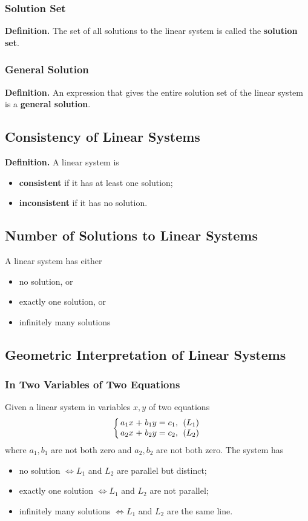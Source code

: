 \documentclass[../ma2001_notes.tex]{subfiles}
\begin{document}
\subsubsection{Solution Set}
\textbf{Definition.} The set of all solutions to the linear system is called the \textbf{solution set}.

\subsubsection{General Solution}
\textbf{Definition.} An expression that gives the entire solution set of the linear system is a \textbf{general solution}.

\subsection{Consistency of Linear Systems}
\textbf{Definition.} A linear system is
\begin{itemize}
	\item \textbf{consistent} if it has at least one solution;
	\item \textbf{inconsistent} if it has no solution.
\end{itemize}

\subsection{Number of Solutions to Linear Systems}
A linear system has either
\begin{itemize}
	\item no solution, or
	\item exactly one solution, or
	\item infinitely many solutions
\end{itemize}

\subsection{Geometric Interpretation of Linear Systems}
\subsubsection{In Two Variables of Two Equations}
Given a linear system in variables \(x, y\) of two equations
\[\left\{
\arraycolsep=1.4pt
\begin{array}{cccccc}
	a_1x & + & b_1y & = & c_1, & \ (L_1) \\
	a_2x & + & b_2y & = & c_2, & \ (L_2)
\end{array}\right.\]
where \(a_1, b_1\) are not both zero and \(a_2, b_2\) are not both zero. The system has
\begin{itemize}
	\item no solution \(\iff L_1\) and \(L_2\) are parallel but distinct;
	\item exactly one solution \(\iff L_1\) and \(L_2\) are not parallel;
	\item infinitely many solutions \(\iff L_1\) and \(L_2\) are the same line.
\end{itemize}
\end{document}

